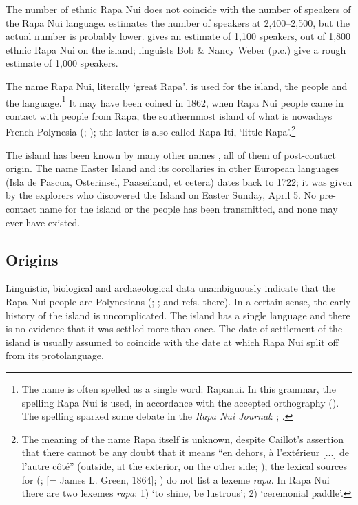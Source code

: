 The number of ethnic Rapa Nui does not coincide with the number of speakers of the Rapa Nui language. \citet{Wurm2007} estimates the number of speakers at 2,400–2,500, but the actual number is probably lower. \citet[192]{Makihara2001Adaptation} gives an estimate of 1,100 speakers, out of 1,800 ethnic Rapa Nui on the island; linguists Bob \& Nancy Weber (p.c.) give a rough estimate of 1,000 speakers.

The name Rapa Nui, literally ‘great Rapa’, is used for the island, the people and the language.\footnote{\label{fn:3}The name is often spelled as a single word: Rapanui. In this grammar, the spelling Rapa Nui is used, in accordance with the accepted orthography (). The spelling sparked some debate in the \textit{Rapa Nui Journal}: \citet{Fischer1991,Fischer1993Or,Fischer1993Hoki}; \citet{WeberWeber1991}.} It may have been coined in 1862, when Rapa Nui people came in contact  
with people from Rapa, the southernmost island of what is nowadays French Polynesia (\citealt[64]{Fischer1993Naming}; \citealt[91]{Fischer2005}); the latter is also called Rapa Iti, ‘little Rapa’.\footnote{\label{fn:4}The meaning of the name Rapa itself is unknown, despite Caillot’s assertion that there cannot be any doubt that it means “en dehors, à l’extérieur [...] de l’autre côté” (outside, at the exterior, on the other side; \citealt[69]{Caillot1932}); the lexical sources for  (\citealt{Stokes1955}; \citealt{Fischer1996Green} [= James L. Green, 1864]; \citealt{KievietKieviet2006}) do not list a lexeme \textit{rapa}. In Rapa Nui there are two lexemes \textit{rapa}: 1) ‘to shine, be lustrous’; 2) ‘ceremonial paddle’.} 

The island has been known by many other names \citep{Fischer1993Naming}, all of them of post-contact origin. The name Easter Island and its corollaries in other European languages (Isla de Pascua, Osterinsel, Paaseiland, et cetera) dates back to 1722; it was given by the  explorers who discovered the Island on Easter Sunday, April 5. No pre-contact name for the island or the people has been transmitted, and none may ever have existed.

\subsection{Origins}\label{sec:1.1.2}
\largerpage
Linguistic, biological and archaeological data unambiguously indicate that the Rapa Nui people are Polynesians (\citealt{Green2000}; \citealt{Kirch2000}; \citealt{StefanCollinsCuny2002} and refs. there). In a certain sense, the early history of the island is uncomplicated. The island has a single language and there is no evidence that it was settled more than once. The date of settlement of the island is usually assumed to coincide with the date at which Rapa Nui split off from its protolanguage. 

